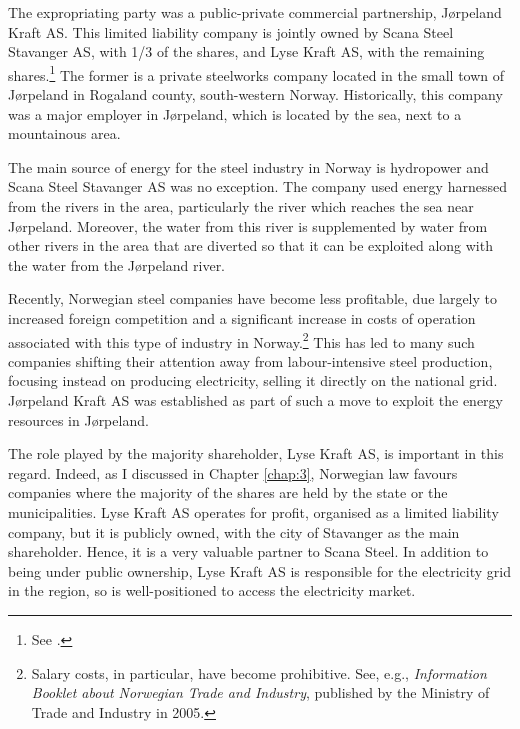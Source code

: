 The expropriating party was a public-private commercial partnership, Jørpeland Kraft AS. This limited liability company is jointly owned by Scana Steel Stavanger AS, with 1/3 of the shares, and Lyse Kraft AS, with the remaining shares.\footnote{See \cite[2]{jorpeland09}.} The former is a private steelworks company located in the small town of Jørpeland in Rogaland county, south-western Norway. Historically, this company was a major employer in Jørpeland, which is located by the sea, next to a mountainous area.

The main source of energy for the steel industry in Norway is hydropower and Scana Steel Stavanger AS was no exception. The company used energy harnessed from the rivers in the area, particularly the river which reaches the sea near Jørpeland. Moreover, the water from this river is supplemented by water from other rivers in the area that are diverted so that it can be exploited along with the water from the Jørpeland river.

Recently, Norwegian steel companies have become less profitable, due largely to increased foreign competition and a significant increase in costs of operation associated with this type of industry in Norway.\footnote{Salary costs, in particular, have become prohibitive. See, e.g., \emph{Information Booklet about Norwegian Trade and Industry}, published by the Ministry of Trade and Industry in 2005.} This has led to many such companies shifting their attention away from labour-intensive steel production, focusing instead on producing electricity, selling it directly on the national grid. Jørpeland Kraft AS was established as part of such a move to exploit the energy resources in Jørpeland.

The role played by the majority shareholder, Lyse Kraft AS, is important in this regard. Indeed, as I discussed in Chapter \ref{chap:3}, Norwegian law favours companies where the majority of the shares are held by the state or the municipalities. Lyse Kraft AS operates for profit, organised as a limited liability company, but it is publicly owned, with the city of Stavanger as the main shareholder. Hence, it is a very valuable partner to Scana Steel. In addition to being under public ownership, Lyse Kraft AS is responsible for the electricity grid in the region, so is well-positioned to access the electricity market.


